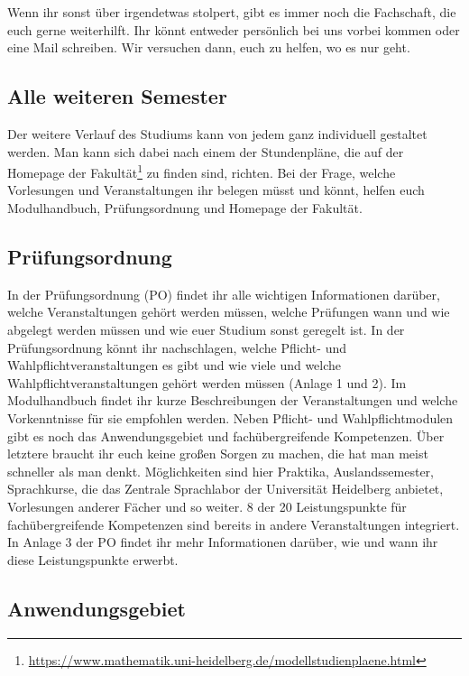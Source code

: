 Wenn ihr sonst über irgendetwas stolpert, gibt es immer noch die Fachschaft, die euch gerne weiterhilft. Ihr könnt entweder persönlich bei uns vorbei kommen oder eine Mail schreiben. Wir versuchen dann, euch zu helfen, wo es nur geht.

\subsection{Alle weiteren Semester}

Der weitere Verlauf des Studiums kann von jedem ganz individuell gestaltet werden. Man kann sich dabei nach einem der Stundenpläne, die auf der Homepage der Fakultät\footnote{\url{https://www.mathematik.uni-heidelberg.de/modellstudienplaene.html}} zu finden sind, richten. Bei der Frage, welche Vorlesungen und Veranstaltungen ihr belegen müsst und könnt, helfen euch Modulhandbuch, Prüfungsordnung und Homepage der Fakultät.

\subsection{Prüfungsordnung}

In der Prüfungsordnung (PO) findet ihr alle wichtigen Informationen darüber, welche Veranstaltungen gehört werden müssen, welche Prüfungen wann und wie abgelegt werden müssen und wie euer Studium sonst geregelt ist. In der Prüfungsordnung könnt ihr nachschlagen, welche Pflicht- und Wahlpflichtveranstaltungen es gibt und wie viele und welche Wahlpflichtveranstaltungen gehört werden müssen (Anlage 1 und 2).  Im Modulhandbuch findet ihr kurze Beschreibungen der Veranstaltungen und welche Vorkenntnisse für sie empfohlen werden. Neben Pflicht- und Wahlpflichtmodulen gibt es noch das Anwendungsgebiet und fachübergreifende Kompetenzen. Über letztere braucht ihr euch keine großen Sorgen zu machen, die hat man meist schneller als man denkt. Möglichkeiten sind hier Praktika, Auslandssemester, Sprachkurse, die das Zentrale Sprachlabor der Universität Heidelberg anbietet, Vorlesungen anderer Fächer und so weiter. 8 der 20 Leistungspunkte für fachübergreifende Kompetenzen sind bereits in andere Veranstaltungen integriert. In Anlage 3 der PO findet ihr mehr Informationen darüber, wie und wann ihr diese Leistungspunkte erwerbt.

\subsection{Anwendungsgebiet}

